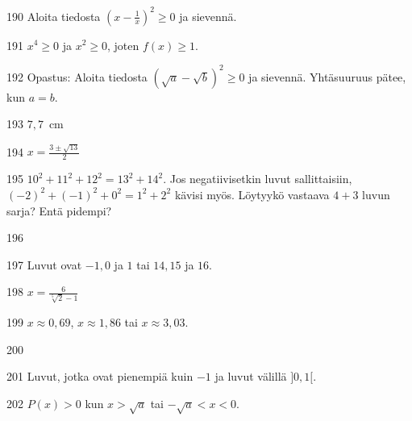 \begin{Vastaus}{190}
     Aloita tiedosta $\left(x-\frac{1}{x}\right)^2 \geq 0$ ja sievennä.
    
\end{Vastaus}
\begin{Vastaus}{191}
     $x^4\geq 0$ ja $x^2 \geq 0$, joten $f(x) \geq 1$.
    
\end{Vastaus}
\begin{Vastaus}{192}
     Opastus: Aloita tiedosta $\left(\sqrt{a}-\sqrt{b}\right)^2 \geq 0$ ja sievennä. Yhtäsuuruus pätee, kun $a = b$.
    
\end{Vastaus}
\begin{Vastaus}{193}
     $7,7$~cm
    
\end{Vastaus}
\begin{Vastaus}{194}
    $x =\frac{3 \pm \sqrt{13}}{2}$
    
\end{Vastaus}
\begin{Vastaus}{195}
		$10^2+11^2+12^2 = 13^2 + 14^2$.
    	Jos negatiivisetkin luvut sallittaisiin, $(-2)^2+(-1)^2+0^2 = 1^2 + 2^2$ kävisi 			myös. Löytyykö vastaava $4 + 3$ luvun sarja? Entä pidempi?
    
\end{Vastaus}
\begin{Vastaus}{196}
		\begin{alakohdat}
		\end{alakohdat}
    
\end{Vastaus}
\begin{Vastaus}{197}
	Luvut ovat $-1, 0$ ja $1$ tai $14, 15$ ja $16$.
    
\end{Vastaus}
\begin{Vastaus}{198}
	$x=\frac{6}{\sqrt[5]{2}-1}$
    
\end{Vastaus}
\begin{Vastaus}{199}
	$x \approx 0,69$, $x \approx 1,86$ tai $x \approx 3,03$.
    
\end{Vastaus}
\begin{Vastaus}{200}
		\begin{alakohdat}
		\alakohta{$-5<x<0$ tai $3 < x$}
		\alakohta{$x<0$ tai $x = 1$}
		\end{alakohdat}
    
\end{Vastaus}
\begin{Vastaus}{201}
	Luvut, jotka ovat pienempiä kuin $-1$ ja luvut välillä $]0,1[$.
    
\end{Vastaus}
\begin{Vastaus}{202}
	$P(x)>0$ kun $x > \sqrt{a}$ tai $-\sqrt{a}<x<0$.
    
\end{Vastaus}
